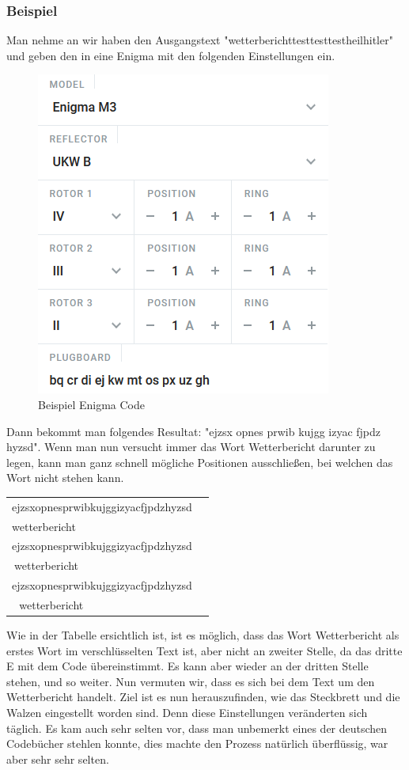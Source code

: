 \subsubsection{Beispiel}
Man nehme an wir haben den Ausgangstext "wetterberichttesttesttestheilhitler" und geben den in eine Enigma mit den folgenden Einstellungen ein. \begin{figure}
	\includegraphics[scale=0.5]{codegen.png}
	\caption{Beispiel Enigma Code\cite{encoding}}
	\label{fig:ecode}
\end{figure}
Dann bekommt man folgendes Resultat: "ejzsx opnes prwib kujgg izyac fjpdz hyzsd". Wenn man nun versucht immer das Wort Wetterbericht darunter zu legen, kann man ganz schnell mögliche Positionen ausschließen, bei welchen das Wort nicht stehen kann.
\begin{table}[H]
	\begin{tabular}{|l|l|}
		\hline
		ejzsxopnesprwibkujggizyacfjpdzhyzsd \\
		wetterbericht                       \\
		\hline
		ejzsxopnesprwibkujggizyacfjpdzhyzsd \\
		$\:$wetterbericht                   \\
		\hline
		ejzsxopnesprwibkujggizyacfjpdzhyzsd \\
		$\:\:\:$wetterbericht               \\
		\hline
	\end{tabular}
\end{table}
Wie in der Tabelle ersichtlich ist, ist es möglich, dass das Wort Wetterbericht als erstes Wort im verschlüsselten Text ist, aber nicht an zweiter Stelle, da das dritte E mit dem Code übereinstimmt. Es kann aber wieder an der dritten Stelle stehen, und so weiter. Nun vermuten wir, dass es sich bei dem Text um den Wetterbericht handelt. Ziel ist es nun herauszufinden, wie das Steckbrett und die Walzen eingestellt worden sind. Denn diese Einstellungen veränderten sich täglich. Es kam auch sehr selten vor, dass man unbemerkt eines der deutschen Codebücher stehlen konnte, dies machte den Prozess natürlich überflüssig, war aber sehr sehr selten.
